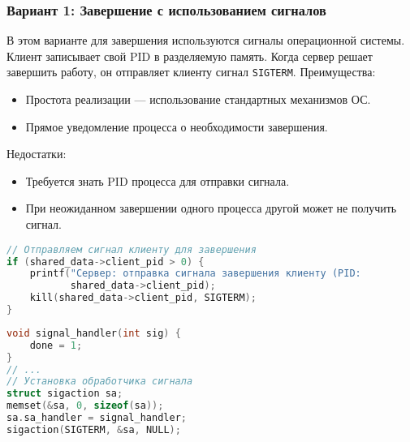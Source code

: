\documentclass[a4paper,12pt]{article}
\begin{document}
\subsubsection{Вариант 1: Завершение с использованием сигналов}
В этом варианте для завершения используются сигналы операционной системы. Клиент записывает свой PID в разделяемую память. Когда сервер решает завершить работу, он отправляет клиенту сигнал \texttt{SIGTERM}.
Преимущества:
\begin{itemize}
    \item Простота реализации — использование стандартных механизмов ОС.
    \item Прямое уведомление процесса о необходимости завершения.
\end{itemize}
Недостатки:
\begin{itemize}
    \item Требуется знать PID процесса для отправки сигнала.
    \item При неожиданном завершении одного процесса другой может не получить сигнал.
\end{itemize}
\begin{lstlisting}[language=C, caption=Фрагмент кода сервера (отправка сигнала клиенту)]
// Отправляем сигнал клиенту для завершения
if (shared_data->client_pid > 0) {
    printf("Сервер: отправка сигнала завершения клиенту (PID: 
           shared_data->client_pid);
    kill(shared_data->client_pid, SIGTERM);
}
\end{lstlisting}
\begin{lstlisting}[language=C, caption=Обработчик сигнала в клиенте]
void signal_handler(int sig) {
    done = 1;
}
// ...
// Установка обработчика сигнала
struct sigaction sa;
memset(&sa, 0, sizeof(sa));
sa.sa_handler = signal_handler;
sigaction(SIGTERM, &sa, NULL);
\end{lstlisting}
\end{document}
